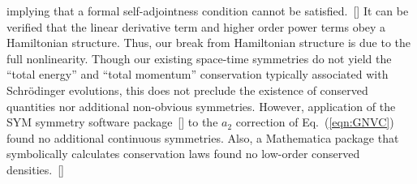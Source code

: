 \documentclass[aps,graphicx,reprint,onecolumn,12pt,tightenlines,longbibliography]{revtex4-1}
\newcommand{\sas}[2]{{#2}}
\begin{document}
%
implying that a formal self-adjointness condition cannot be satisfied.~[] It can be verified that the linear derivative term and higher order power terms obey \sas{and}{a} Hamiltonian structure. Thus, our break from Hamiltonian structure is due to the full nonlinearity. Though our existing space-time symmetries do not yield the ``total energy'' and ``total momentum'' conservation typically associated with Schr\"odinger evolutions, this does not preclude the existence of conserved quantities nor additional non-obvious symmetries. However, application of the SYM symmetry software package~[] to the $a_{2}$ correction of Eq.~(\ref{eqn:GNVC}) found no additional continuous symmetries. Also, a Mathematica package that symbolically calculates conservation laws found no low-order conserved densities.~[]
\end{document}
